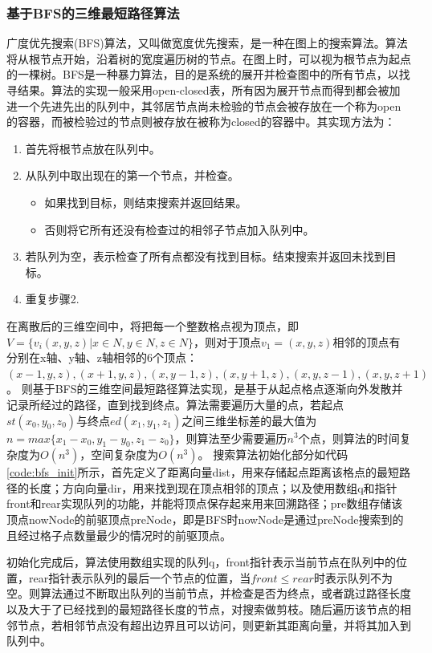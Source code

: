 \subsubsection{基于BFS的三维最短路径算法}
\par 广度优先搜索(BFS)算法，又叫做宽度优先搜索，是一种在图上的搜索算法。算法将从根节点开始，沿着树的宽度遍历树的节点。在图上时，可以视为根节点为起点的一棵树。BFS是一种暴力算法，目的是系统的展开并检查图中的所有节点，以找寻结果。算法的实现一般采用open-closed表，所有因为展开节点而得到都会被加进一个先进先出的队列中，其邻居节点尚未检验的节点会被存放在一个称为open的容器，而被检验过的节点则被存放在被称为closed的容器中。其实现方法为：
\begin{enumerate}
    \item 首先将根节点放在队列中。
    \item 从队列中取出现在的第一个节点，并检查。
    \begin{itemize}
        \item 如果找到目标，则结束搜索并返回结果。
        \item 否则将它所有还没有检查过的相邻子节点加入队列中。
    \end{itemize}
    \item 若队列为空，表示检查了所有点都没有找到目标。结束搜索并返回未找到目标。
    \item 重复步骤2.
\end{enumerate}
\par 在离散后的三维空间中，将把每一个整数格点视为顶点，即$V=\{v_i(x,y,z)|x\in N,y\in N,z\in N\}$，则对于顶点$v_1=(x,y,z)$相邻的顶点有分别在x轴、y轴、z轴相邻的6个顶点：$(x-1,y,z),(x+1,y,z),(x,y-1,z),(x,y+1,z),(x,y,z-1),(x,y,z+1)$。
则基于BFS的三维空间最短路径算法实现，是基于从起点格点逐渐向外发散并记录所经过的路径，直到找到终点。算法需要遍历大量的点，若起点$st(x_0,y_0,z_0)$与终点$ed(x_1,y_1,z_1)$之间三维坐标差的最大值为$n=max\{x_1-x_0,y_1-y_0,z_1-z_0\}$，则算法至少需要遍历$n^3$个点，则算法的时间复杂度为$O(n^3)$，空间复杂度为$O(n^3)$。
搜索算法初始化部分如代码\ref{code:bfs_init}所示，首先定义了距离向量dist，用来存储起点距离该格点的最短路径的长度；方向向量dir，用来找到现在顶点相邻的顶点；以及使用数组q和指针front和rear实现队列的功能，并能将顶点保存起来用来回溯路径；pre数组存储该顶点nowNode的前驱顶点preNode，即是BFS时nowNode是通过preNode搜索到的且经过格子点数量最少的情况时的前驱顶点。

\par 初始化完成后，算法使用数组实现的队列q，front指针表示当前节点在队列中的位置，rear指针表示队列的最后一个节点的位置，当$front\leq rear$时表示队列不为空。则算法通过不断取出队列的当前节点，并检查是否为终点，或者跳过路径长度以及大于了已经找到的最短路径长度的节点，对搜索做剪枝。随后遍历该节点的相邻节点，若相邻节点没有超出边界且可以访问，则更新其距离向量，并将其加入到队列中。
